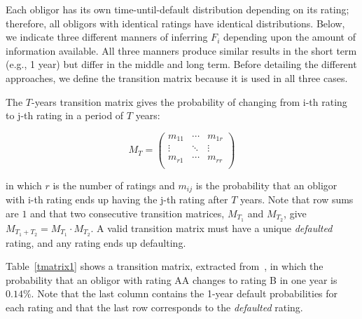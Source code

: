 \documentclass[11pt,fleqn]{book} %
\begin{document}
Each obligor has its own time-until-default distribution depending on its 
rating; therefore, all obligors with identical ratings have identical
distributions. Below, we indicate three different manners of inferring $F_i$ 
depending upon the amount of information available. All three manners produce 
similar results in the short term (e.g., 1 year) but differ in the middle and
long term. Before detailing the different approaches, we define the transition 
matrix because it is used in all three cases.

\begin{definition}
	\label{def:tm}
	The $T$-years transition matrix gives the probability of changing 
	from i-th rating to j-th rating in a period of $T$ years:
	{\small
	\begin{displaymath}
		M_T = \left(
		\begin{array}{ccc}
			m_{11} & \cdots & m_{1r} \\
			\vdots & \ddots & \vdots \\
			m_{r1} & \cdots & m_{rr} \\
		\end{array}
		\right)
	\end{displaymath}\par}
	in which $r$ is the number of ratings and $m_{ij}$ is the probability that 
	an obligor with i-th rating ends up having the j-th rating after $T$ years.
	Note that row sums are $1$ and that two consecutive transition matrices, 
	$M_{T_1}$ and $M_{T_2}$, give $M_{T_1+T_2} = M_{T_1} \cdot M_{T_2}$.
	A valid transition matrix must have a unique \emph{defaulted} rating, and 
	any rating ends up defaulting.
\end{definition}

\begin{example}
	\label{ex:1ytm}
	Table~\ref{tmatrix1} shows a transition matrix, extracted 
	from~\cite[p. 20]{cmetrics:1997}, in which the probability that an obligor 
	with rating AA changes to rating B in one year is $0.14\%$. Note that the
	last column contains the 1-year default probabilities for each rating and 
	that the last row corresponds to the \emph{defaulted} rating.
\end{example}
\end{document}
